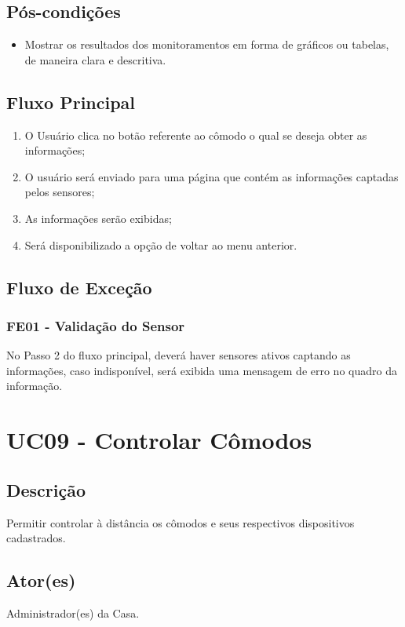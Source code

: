 \begin{anexosenv}
    \subsection{Pós-condições}
        \begin{itemize}
            \item Mostrar os resultados dos monitoramentos em forma de gráficos ou tabelas, de maneira clara e descritiva.
        \end{itemize}
    \subsection{Fluxo Principal}
        \begin{enumerate}
            \item O Usuário clica no botão referente ao cômodo o qual se deseja obter as informações;
            \item O usuário será enviado para uma página que contém as informações captadas pelos sensores;
            \item As informações serão exibidas;
            \item Será disponibilizado a opção de voltar ao menu anterior.
        \end{enumerate}
    \subsection{Fluxo de Exceção}
        \subsubsection{FE01 - Validação do Sensor}
            No Passo 2 do fluxo principal, deverá haver sensores ativos captando as informações, caso indisponível, será exibida uma mensagem de erro no quadro da informação.

\section{UC09 \-- Controlar Cômodos}
    \subsection{Descrição}
        Permitir controlar à distância os cômodos e seus respectivos dispositivos cadastrados.
    \subsection{Ator(es)}
        Administrador(es) da Casa.

\end{anexosenv}
